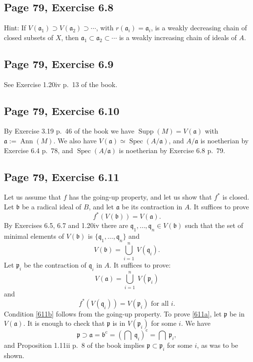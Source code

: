 \documentclass[parskip=half,fontsize=12pt]{scrartcl}%
\newcommand{\oo}{\operatorname}\newcommand{\ooo}{\operatorname*}
\newcommand{\mf}{\mathfrak}
\newcommand{\aaa}{\mf a}
\newcommand{\bbb}{\mf b}
\newcommand{\ppp}{\mf p}
\newcommand{\qqq}{\mf q}
\begin{document}
\subsection{Page 79, Exercise 6.8}%

Hint: If $V(\aaa_1)\supset V(\aaa_2)\supset\cdots$, with $r(\aaa_i)=\aaa_i$, is a weakly decreasing chain of closed subsets of $X$, then $\aaa_1\subset\aaa_2\subset\cdots$ is a weakly increasing chain of ideals of $A$. 

\subsection{Page 79, Exercise 6.9}%

See Exercise 1.20iv p.~13 of the book.

\subsection{Page 79, Exercise 6.10}%

By Exercise 3.19 p.~46 of the book we have $\oo{Supp}(M)=V(\aaa)$ with $\aaa:=\oo{Ann}(M)$. We also have $V(\aaa)\simeq\oo{Spec}(A/\aaa)$, and $A/\aaa$ is noetherian by Exercise 6.4 p.~78, and $\oo{Spec}(A/\aaa)$ is noetherian by Exercise 6.8 p.~79. 

\subsection{Page 79, Exercise 6.11}%

Let us assume that $f$ has the going-up property, and let us show that $f^*$ is closed. Let $\bbb$ be a radical ideal of $B$, and let $\aaa$ be its contraction in $A$. It suffices to prove 
$$
f^*(V(\bbb))=V(\aaa).
$$ 
By Exercises 6.5, 6.7 and 1.20iv there are $\qqq_1,\dots,\qqq_n\in V(\bbb)$ such that the set of minimal elements of $V(\bbb)$ is $\{\qqq_1,\dots,\qqq_n\}$ and 
$$
V(\bbb)=\bigcup_{i=1}^n\ V(\qqq_i).
$$ 
Let $\ppp_i$ be the contraction of $\qqq_i$ in $A$. It suffices to prove: 
\begin{equation}\label{611a}
V(\aaa)=\bigcup_{i=1}^n\ V(\ppp_i)
\end{equation} 
and 
\begin{equation}\label{611b}
f^*(V(\qqq_i))=V(\ppp_i)\text{ for all }i.
\end{equation} 
Condition \eqref{611b} follows from the going-up property. To prove \eqref{611a}, let $\ppp$ be in $V(\aaa)$. It is enough to check that $\ppp$ is in $V(\ppp_i)$ for some $i$. We have 
$$
\ppp\supset\aaa=\bbb^{\oo c}=\left(\bigcap\ \qqq_i\right)^{\oo c}=\bigcap\ \ppp_i,
$$ 
and Proposition 1.11ii p.~8 of the book implies $\ppp\subset\ppp_i$ for some $i$, as was to be shown. 
\end{document}
